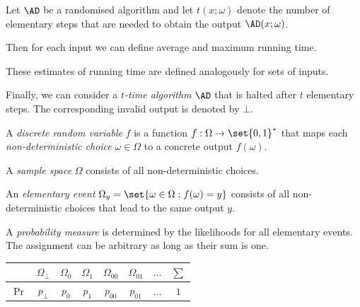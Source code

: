 \documentclass[landscape,footrule]{foils}
\newcommand{\lastline}{\vspace*{-2ex}}
\begin{document}

Let $\AD$ be a randomised algorithm and let $t(x;\omega)$ denote the
number of elementary steps that are needed to obtain the output $\AD(x;\omega)$.

Then for each input we can define average and maximum running time. 


These estimates of running time are defined analogously for sets of inputs.


Finally, we can consider a \emph{$t$-time algorithm} $\AD$ that is halted
after $t$ elementary steps. The corresponding invalid output is
denoted by $\bot$.\lastline




A \emph{discrete random variable} $f$ is a function $f:\Omega\to
\set{0,1}^*$ that maps each \emph{non-deterministic choice}
$\omega\in\Omega$ to a concrete output $f(\omega)$.


\begin{triangles}
  \item A \emph{sample space} $\Omega$ consists of all non-deterministic choices.
  \item An \emph{elementary event} $\Omega_y=\set{\omega\in\Omega:
      f(\omega)=y}$ consists of all non-deterministic choices that lead to
    the same output $y$.
\end{triangles}



A \emph{probability measure} is determined by the likelihoods for all
elementary events. The assignment can be arbitrary as long as their
sum is one.\bigskip

\begin{center}
  \begin{tabular}{|c|c|c|c|c|c|c|c|}
   \hline
  & $\Omega_\bot$ &$\Omega_0$ &$\Omega_{1}$ &$\Omega_{00}$ &$\Omega_{01}$ &$\ldots$ &$\sum$\\
   \hline
  $\Pr$& $p_\bot$ &$p_0$ &$p_{1}$ &$p_{00}$ & $p_{01}$ &$\ldots$ & $1$\\
   \hline
  \end{tabular}
\end{center}
\bigskip
\end{document}
